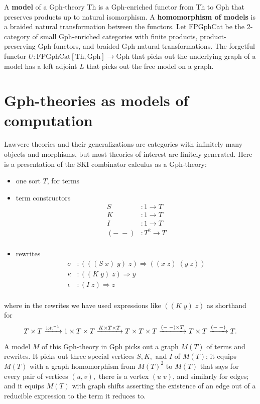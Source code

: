 \documentclass{llncs}
\newcommand{\maps}{\colon}
\newcommand{\Th}{\mathrm{Th}}
\newcommand{\Gph}{\mathrm{Gph}}
\newcommand{\FPGphCat}{\mathrm{FPGphCat}}
\begin{document}
A {\bf model} of a Gph-theory Th is a Gph-enriched functor from Th to Gph that preserves products up to natural isomorphism.  A {\bf homomorphism of models} is a braided natural transformation between the functors.  Let FPGphCat be the 2-category of small Gph-enriched categories with finite products, product-preserving Gph-functors, and braided Gph-natural transformations.  The forgetful functor $U\maps \FPGphCat[\Th, \Gph] \to \Gph$ that picks out the underlying graph of a model has a left adjoint $L$ that picks out the free model on a graph.

\section{Gph-theories as models of computation}

Lawvere theories and their generalizations are categories with infinitely many objects and morphisms, but most theories of interest are finitely generated.  Here is a presentation of the SKI combinator calculus as a Gph-theory:
\begin{itemize}
  \item one sort $T$, for terms
  \item term constructors
  \[\begin{array}{rl}
    S&:1 \to T\\
    K&:1 \to T\\
    I&:1 \to T\\
    (-\; -)&: T^2 \to T\\
  \end{array}\]
  \item rewrites
  \[\begin{array}{rl}
    \sigma&:(((S\; x)\; y)\; z) \Rightarrow ((x\; z)\; (y\; z))\\
    \kappa&:((K\; y)\; z) \Rightarrow y\\
    \iota&:(I\; z) \Rightarrow z\\
  \end{array}\]
\end{itemize}
where in the rewrites we have used expressions like $((K\; y)\; z)$ as shorthand for
\[ T\times T \xrightarrow{\tiny\mbox{left}^{-1}} 1\times T \times T \xrightarrow{K \times T \times T} T\times T \times T \xrightarrow{(-\;-)\times T} T\times T \xrightarrow{(-\;-)} T. \]

A model $M$ of this Gph-theory in Gph picks out a graph $M(T)$ of terms and rewrites.  It picks out three special vertices $S,K,$ and $I$ of $M(T)$; it equips $M(T)$ with a graph homomorphism from $M(T)^2$ to $M(T)$ that says for every pair of vertices $(u,v),$ there is a vertex $(u\;v)$, and similarly for edges; and it equips $M(T)$ with graph shifts asserting the existence of an edge out of a reducible expression to the term it reduces to.
\end{document}
